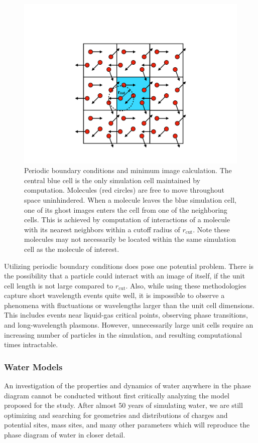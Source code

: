 \begin{figure}
\includegraphics[width=\linewidth]{Figures/PBC}
\caption{\label{fig:PBC} Periodic boundary conditions and minimum
  image calculation. The central blue cell is the only simulation cell
  maintained by computation. Molecules (red circles) are free to move
  throughout space uninhindered. When a molecule leaves the blue
  simulation cell, one of its ghost images enters the cell from one of
  the neighboring cells. This is achieved by computation of
  interactions of a molecule with its nearest neighbors within a
  cutoff radius of $r_{\mathrm{cut}}$. Note these molecules may not
  necessarily be located within the same simulation cell as the
  molecule of interest.}
\end{figure}

Utilizing periodic boundary conditions does pose one potential
problem. There is the possibility that a particle could interact with
an image of itself, if the unit cell length is not large compared to
$r_{\mathrm{cut}}$. Also, while using these methodologies capture
short wavelength events quite well, it is impossible to observe a
phenomena with fluctuations or wavelengths larger than the unit cell
dimensions. This includes events near liquid-gas critical points,
observing phase transitions, and long-wavelength plasmons. However,
unnecessarily large unit cells require an increasing number of
particles in the simulation, and resulting computational times
intractable.



\subsubsection{Water Models}\label{sec:WaterModels}
An investigation of the properties and dynamics of water anywhere in
the phase diagram cannot be conducted without first critically
analyzing the model proposed for the study. After almost 50 years of
simulating water, we are still optimizing and searching for geometries
and distributions of charges and potential sites, mass sites, and many
other parameters which will reproduce the phase diagram of water in
closer detail.

